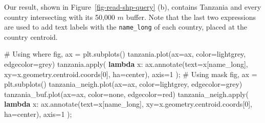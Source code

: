\documentclass[
  letterpaper,
]{krantz}
\newenvironment{Shaded}{\begin{snugshade}}{\end{snugshade}}
\newcommand{\BuiltInTok}[1]{\textcolor[rgb]{0.00,0.23,0.31}{#1}}
\newcommand{\CommentTok}[1]{\textcolor[rgb]{0.37,0.37,0.37}{#1}}
\newcommand{\DecValTok}[1]{\textcolor[rgb]{0.68,0.00,0.00}{#1}}
\newcommand{\KeywordTok}[1]{\textcolor[rgb]{0.00,0.23,0.31}{\textbf{#1}}}
\newcommand{\NormalTok}[1]{\textcolor[rgb]{0.00,0.23,0.31}{#1}}
\newcommand{\OperatorTok}[1]{\textcolor[rgb]{0.37,0.37,0.37}{#1}}
\newcommand{\StringTok}[1]{\textcolor[rgb]{0.13,0.47,0.30}{#1}}
\begin{document}
Our result, shown in Figure~\ref{fig-read-shp-query} (b), contains
Tanzania and every country intersecting with its 50,000 \(m\) buffer.
Note that the last two expressions are used to add text labels with the
\texttt{name\_long} of each country, placed at the country centroid.

\begin{Shaded}
\begin{Highlighting}[]
\CommentTok{\# Using \textquotesingle{}where\textquotesingle{}}
\NormalTok{fig, ax }\OperatorTok{=}\NormalTok{ plt.subplots()}
\NormalTok{tanzania.plot(ax}\OperatorTok{=}\NormalTok{ax, color}\OperatorTok{=}\StringTok{\textquotesingle{}lightgrey\textquotesingle{}}\NormalTok{, edgecolor}\OperatorTok{=}\StringTok{\textquotesingle{}grey\textquotesingle{}}\NormalTok{)}
\NormalTok{tanzania.}\BuiltInTok{apply}\NormalTok{(}
    \KeywordTok{lambda}\NormalTok{ x: ax.annotate(text}\OperatorTok{=}\NormalTok{x[}\StringTok{\textquotesingle{}name\_long\textquotesingle{}}\NormalTok{], }
\NormalTok{    xy}\OperatorTok{=}\NormalTok{x.geometry.centroid.coords[}\DecValTok{0}\NormalTok{], ha}\OperatorTok{=}\StringTok{\textquotesingle{}center\textquotesingle{}}\NormalTok{), axis}\OperatorTok{=}\DecValTok{1}
\NormalTok{)}\OperatorTok{;}
\CommentTok{\# Using \textquotesingle{}mask\textquotesingle{}}
\NormalTok{fig, ax }\OperatorTok{=}\NormalTok{ plt.subplots()}
\NormalTok{tanzania\_neigh.plot(ax}\OperatorTok{=}\NormalTok{ax, color}\OperatorTok{=}\StringTok{\textquotesingle{}lightgrey\textquotesingle{}}\NormalTok{, edgecolor}\OperatorTok{=}\StringTok{\textquotesingle{}grey\textquotesingle{}}\NormalTok{)}
\NormalTok{tanzania\_buf.plot(ax}\OperatorTok{=}\NormalTok{ax, color}\OperatorTok{=}\StringTok{\textquotesingle{}none\textquotesingle{}}\NormalTok{, edgecolor}\OperatorTok{=}\StringTok{\textquotesingle{}red\textquotesingle{}}\NormalTok{)}
\NormalTok{tanzania\_neigh.}\BuiltInTok{apply}\NormalTok{(}
    \KeywordTok{lambda}\NormalTok{ x: ax.annotate(text}\OperatorTok{=}\NormalTok{x[}\StringTok{\textquotesingle{}name\_long\textquotesingle{}}\NormalTok{],}
\NormalTok{    xy}\OperatorTok{=}\NormalTok{x.geometry.centroid.coords[}\DecValTok{0}\NormalTok{], ha}\OperatorTok{=}\StringTok{\textquotesingle{}center\textquotesingle{}}\NormalTok{), axis}\OperatorTok{=}\DecValTok{1}
\NormalTok{)}\OperatorTok{;}
\end{Highlighting}
\end{Shaded}
\end{document}
